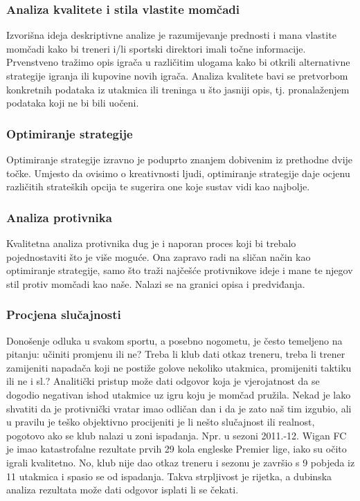 \documentclass{ferseminar}
\begin{document}
\subsubsection{Analiza kvalitete i stila vlastite momčadi}
Izvorišna ideja deskriptivne analize je razumijevanje prednosti i mana vlastite momčadi kako bi treneri i/li sportski direktori imali točne informacije. Prvenstveno tražimo opis igrača u različitim ulogama kako bi otkrili alternativne strategije igranja ili kupovine novih igrača. Analiza kvalitete bavi se pretvorbom konkretnih podataka iz utakmica ili treninga u što jasniji opis, tj. pronalaženjem podataka koji ne bi bili uočeni.\cite{stats}

\subsubsection{Optimiranje strategije}
Optimiranje strategije izravno je poduprto znanjem dobivenim iz prethodne dvije točke. Umjesto da ovisimo o kreativnosti ljudi, optimiranje strategije daje ocjenu različitih strateških opcija te sugerira one koje sustav vidi kao najbolje.

\subsubsection{Analiza protivnika}
Kvalitetna analiza protivnika dug je i naporan proces koji bi trebalo pojednostaviti što je više moguće. Ona zapravo radi na sličan način kao optimiranje strategije, samo što traži najčešće protivnikove ideje i mane te njegov stil protiv momčadi kao naše. Nalazi se na granici opisa i predviđanja.

\subsubsection{Procjena slučajnosti}
Donošenje odluka u svakom sportu, a posebno nogometu, je često temeljeno na pitanju: učiniti promjenu ili ne? Treba li klub dati otkaz treneru, treba li trener zamijeniti napadača koji ne postiže golove nekoliko utakmica, promijeniti taktiku ili ne i sl.? Analitički pristup može dati odgovor koja je vjerojatnost da se dogodio negativan ishod utakmice uz igru koju je momčad pružila. Nekad je lako shvatiti da je protivnički vratar imao odličan dan i da je zato naš tim izgubio, ali u pravilu je teško objektivno procijeniti je li nešto slučajnost ili realnost, pogotovo ako se klub nalazi u zoni ispadanja. Npr. u sezoni 2011.-12. Wigan FC je imao katastrofalne rezultate prvih 29 kola engleske Premier lige, iako su očito igrali kvalitetno. No, klub nije dao otkaz treneru i sezonu je završio s 9 pobjeda iz 11 utakmica i spasio se od ispadanja. Takva strpljivost je rijetka, a dubinska analiza rezultata može dati odgovor isplati li se čekati.\cite{odds}
\end{document}
